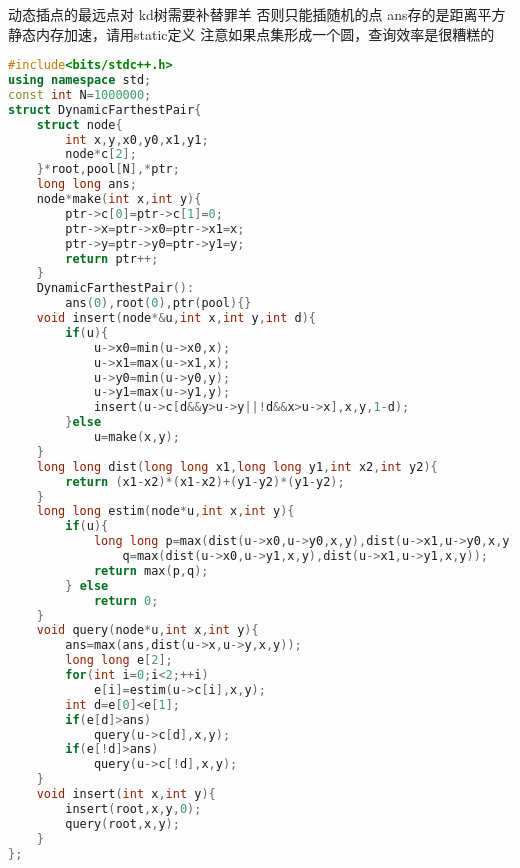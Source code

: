 \documentclass{book}
\begin{document}
动态插点的最远点对
kd树需要补替罪羊
否则只能插随机的点
ans存的是距离平方
静态内存加速，请用static定义
注意如果点集形成一个圆，查询效率是很糟糕的
\begin{lstlisting}[language=C++,title={Dynamic Farthest Pair.hpp (1545 bytes, 54 lines)}]
#include<bits/stdc++.h>
using namespace std;
const int N=1000000;
struct DynamicFarthestPair{
    struct node{
        int x,y,x0,y0,x1,y1;
        node*c[2];
    }*root,pool[N],*ptr;
    long long ans;
    node*make(int x,int y){
        ptr->c[0]=ptr->c[1]=0;
        ptr->x=ptr->x0=ptr->x1=x;
        ptr->y=ptr->y0=ptr->y1=y;
        return ptr++;
    }
    DynamicFarthestPair():
        ans(0),root(0),ptr(pool){}
    void insert(node*&u,int x,int y,int d){
        if(u){
            u->x0=min(u->x0,x);
            u->x1=max(u->x1,x);
            u->y0=min(u->y0,y);
            u->y1=max(u->y1,y);
            insert(u->c[d&&y>u->y||!d&&x>u->x],x,y,1-d);
        }else
            u=make(x,y);
    }
    long long dist(long long x1,long long y1,int x2,int y2){
        return (x1-x2)*(x1-x2)+(y1-y2)*(y1-y2);
    }
    long long estim(node*u,int x,int y){
        if(u){
            long long p=max(dist(u->x0,u->y0,x,y),dist(u->x1,u->y0,x,y)),
                q=max(dist(u->x0,u->y1,x,y),dist(u->x1,u->y1,x,y));
            return max(p,q);
        } else
            return 0;
    }
    void query(node*u,int x,int y){
        ans=max(ans,dist(u->x,u->y,x,y));
        long long e[2];
        for(int i=0;i<2;++i)
            e[i]=estim(u->c[i],x,y);
        int d=e[0]<e[1];
        if(e[d]>ans)
            query(u->c[d],x,y);
        if(e[!d]>ans)
            query(u->c[!d],x,y);
    }
    void insert(int x,int y){
        insert(root,x,y,0);
        query(root,x,y);
    }
};\end{lstlisting}
\end{document}
